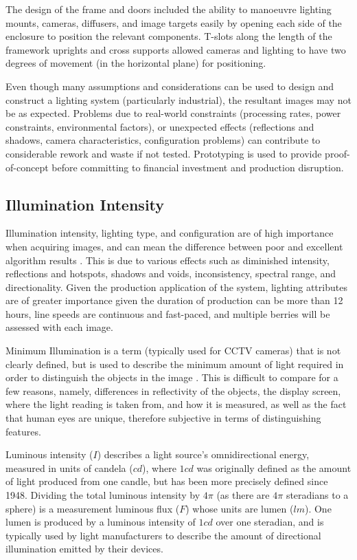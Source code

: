 \documentclass[fleqn,twoside,12pt]{report}
\begin{document}
 

The design of the frame and doors included the ability to manoeuvre lighting mounts, cameras, diffusers, and image targets easily by opening each side of the enclosure to position the relevant components. T-slots along the length of the framework uprights and cross supports allowed cameras and lighting to have two degrees of movement (in the horizontal plane) for positioning. 

Even though many assumptions and considerations can be used to design and construct a lighting system (particularly industrial), the resultant images may not be as expected. Problems due to real-world constraints (processing rates, power constraints, environmental factors), or unexpected effects (reflections and shadows, camera characteristics, configuration problems) can contribute to considerable rework and waste if not tested. Prototyping is used to provide proof-of-concept before committing to financial investment and production disruption.



\subsection{Illumination Intensity}

Illumination intensity, lighting type, and configuration are of high importance when acquiring images, and can mean the difference between poor and excellent algorithm results \cite{lorente,kondo,liu2}. This is due to various effects such as diminished intensity, reflections and hotspots, shadows and voids, inconsistency, spectral range, and directionality. Given the production application of the system, lighting attributes are of greater importance given the duration of production can be more than 12 hours, line speeds are continuous and fast-paced, and multiple berries will be assessed with each image.

Minimum Illumination is a term (typically used for CCTV cameras) that is not clearly defined, but is used to describe the minimum amount of light required in order to distinguish the objects in the image \cite{min_illumination}. This is difficult to compare for a few reasons, namely, differences in reflectivity of the objects, the display screen, where the light reading is taken from, and how it is measured, as well as the fact that human eyes are unique, therefore subjective in terms of distinguishing features. 

Luminous intensity ($I$) describes a light source's omnidirectional energy, measured in units of candela ($cd$), where $1cd$ was originally defined as the amount of light produced from one candle, but has been more precisely defined since 1948\cite{light_units}. Dividing the total luminous intensity by $4\pi$ (as there are $4\pi$ steradians to a sphere) is a measurement luminous flux ($F$) whose units are lumen ($lm$). One lumen is produced by a luminous intensity of $1cd$ over one steradian, and is typically used by light manufacturers to describe the amount of directional illumination emitted by their devices.
\end{document}
